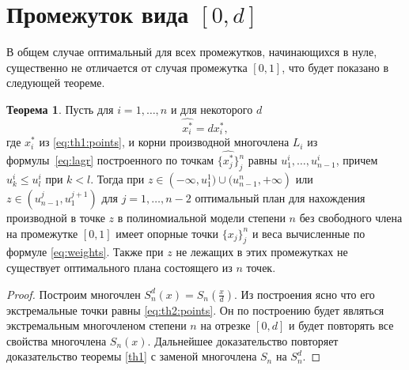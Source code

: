 \documentclass[specialist,
               substylefile = spbu.rtx,
               subf,href,colorlinks=true, 12pt]{disser}
\theoremstyle{definition}
\newtheorem{theorem}{Теорема}
\begin{document}
	\section{Промежуток вида $[0, d]$}
	
	В общем случае оптимальный для всех промежутков, начинающихся в нуле, существенно не отличается от случая промежутка $[0, 1]$, что будет показано в следующей теореме.
	
	\begin{theorem}
		Пусть для $i = 1, \ldots, n$ и для некоторого $d$
		\begin{equation}
			\label{eq:th2:points}
			\widehat{x_i^*} = d x_i^* ,
		\end{equation}
		где $x_i^*$ из \eqref{eq:th1:points}, и корни производной многочлена $L_i$ из формулы~\eqref{eq:lagr} построенного по точкам $\{\widehat{x_j^*}\}_j^n$ равны $u_1^i, \ldots, u_{n-1}^i$, причем $u_k^i \leqslant u_l^i$ при $k < l$. Тогда при $z \in \left(-\infty, u_1^1) \cup (u_{n-1}^n, +\infty \right)$ или $z \in \left( u_{n-1}^j, u_1^{j+1} \right)$ для $j=1, \ldots, n-2$ оптимальный план для нахождения производной в точке $z$ в полиномиальной модели степени $n$ без свободного члена на промежутке $[0, 1]$ имеет опорные точки $\{x_j\}_j^n$ и веса вычисленные по формуле \eqref{eq:weights}. Также при $z$ не лежащих в этих промежутках не существует оптимального плана состоящего из $n$ точек.
	\end{theorem}
	
	\begin{proof}
		Построим многочлен $S_n^d(x) = S_n(\frac{x}{d})$. Из построения ясно что его экстремальные точки равны \eqref{eq:th2:points}. Он по построению будет являться экстремальным многочленом степени $n$ на отрезке $[0, d]$ и будет повторять все свойства многочлена $S_n(x)$. Дальнейшее доказательство повторяет доказательство теоремы \ref{th1} с заменой многочлена $S_n$ на $S_n^d$.
	\end{proof}	
	
	

	
	\nocite{*}
	
	
	
\end{document}
